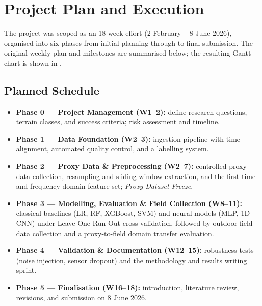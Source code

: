 \section{Project Plan and Execution}
\label{sec:project-plan}

The project was scoped as an 18-week effort (2 February – 8 June 2026), organised into six phases from initial planning through to final submission. The original weekly plan and milestones are summarised below; the resulting Gantt chart is shown in .

\subsection{Planned Schedule}

\begin{itemize}
    \item \textbf{Phase 0 — Project Management (W1–2):} define research questions, terrain classes, and success criteria; risk assessment and timeline.
    \item \textbf{Phase 1 — Data Foundation (W2–3):} ingestion pipeline with time alignment, automated quality control, and a labelling system.
    \item \textbf{Phase 2 — Proxy Data \& Preprocessing (W2–7):} controlled proxy data collection, resampling and sliding-window extraction, and the first time- and frequency-domain feature set; \emph{Proxy Dataset Freeze}.
    \item \textbf{Phase 3 — Modelling, Evaluation \& Field Collection (W8–11):} classical baselines (LR, RF, XGBoost, SVM) and neural models (MLP, 1D-CNN) under Leave-One-Run-Out cross-validation, followed by outdoor field data collection and a proxy-to-field domain transfer evaluation.
    \item \textbf{Phase 4 — Validation \& Documentation (W12–15):} robustness tests (noise injection, sensor dropout) and the methodology and results writing sprint.
    \item \textbf{Phase 5 — Finalisation (W16–18):} introduction, literature review, revisions, and submission on 8 June 2026.
\end{itemize}


